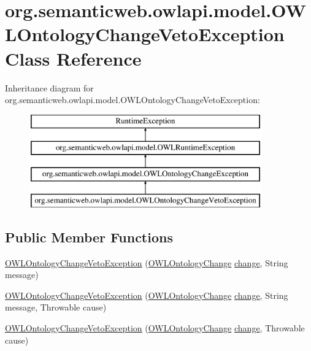\hypertarget{classorg_1_1semanticweb_1_1owlapi_1_1model_1_1_o_w_l_ontology_change_veto_exception}{\section{org.\-semanticweb.\-owlapi.\-model.\-O\-W\-L\-Ontology\-Change\-Veto\-Exception Class Reference}
\label{classorg_1_1semanticweb_1_1owlapi_1_1model_1_1_o_w_l_ontology_change_veto_exception}
}
Inheritance diagram for org.\-semanticweb.\-owlapi.\-model.\-O\-W\-L\-Ontology\-Change\-Veto\-Exception\-:\begin{figure}[H]
\begin{center}
\leavevmode
\includegraphics[height=4.000000cm]{classorg_1_1semanticweb_1_1owlapi_1_1model_1_1_o_w_l_ontology_change_veto_exception}
\end{center}
\end{figure}
\subsection*{Public Member Functions}
\begin{DoxyCompactItemize}
\item 
\hyperlink{classorg_1_1semanticweb_1_1owlapi_1_1model_1_1_o_w_l_ontology_change_veto_exception_aba4271852fa85bfc789b094935f265ce}{O\-W\-L\-Ontology\-Change\-Veto\-Exception} (\hyperlink{classorg_1_1semanticweb_1_1owlapi_1_1model_1_1_o_w_l_ontology_change}{O\-W\-L\-Ontology\-Change} \hyperlink{classorg_1_1semanticweb_1_1owlapi_1_1model_1_1_o_w_l_ontology_change_exception_a9e4c14dc90fcc563956fb7207c67640a}{change}, String message)
\item 
\hyperlink{classorg_1_1semanticweb_1_1owlapi_1_1model_1_1_o_w_l_ontology_change_veto_exception_a85b44339df10960e19852bf5de3ce19d}{O\-W\-L\-Ontology\-Change\-Veto\-Exception} (\hyperlink{classorg_1_1semanticweb_1_1owlapi_1_1model_1_1_o_w_l_ontology_change}{O\-W\-L\-Ontology\-Change} \hyperlink{classorg_1_1semanticweb_1_1owlapi_1_1model_1_1_o_w_l_ontology_change_exception_a9e4c14dc90fcc563956fb7207c67640a}{change}, String message, Throwable cause)
\item 
\hyperlink{classorg_1_1semanticweb_1_1owlapi_1_1model_1_1_o_w_l_ontology_change_veto_exception_a3fc2b31538029c01507dde92a46f6206}{O\-W\-L\-Ontology\-Change\-Veto\-Exception} (\hyperlink{classorg_1_1semanticweb_1_1owlapi_1_1model_1_1_o_w_l_ontology_change}{O\-W\-L\-Ontology\-Change} \hyperlink{classorg_1_1semanticweb_1_1owlapi_1_1model_1_1_o_w_l_ontology_change_exception_a9e4c14dc90fcc563956fb7207c67640a}{change}, Throwable cause)
\end{DoxyCompactItemize}
